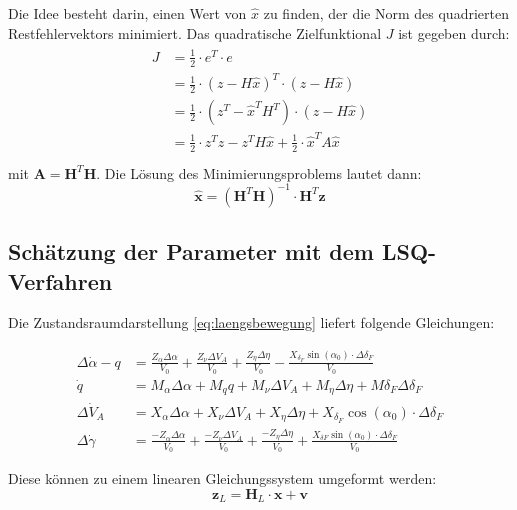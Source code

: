 Die Idee besteht darin, einen Wert von $\hat{x}$ zu finden, der die Norm des quadrierten Restfehlervektors minimiert. Das 
quadratische Zielfunktional $J$ ist gegeben durch: 
\begin{align}
   \begin{split}
     J &= \frac{1}{2} \cdot e^{T} \cdot e \\
     &= \frac{1}{2} \cdot {(z- H\hat{x})}^{T}\cdot(z- H\hat{x}) \\
     &= \frac{1}{2} \cdot (z^{T} -{\hat{x}}^{T}H^{T})\cdot(z- H\hat{x}) \\
     &= \frac{1}{2} \cdot z^{T}z - z^{T}H\hat{x} + \frac{1}{2}\cdot {\hat{x}}^{T}A\hat{x}  \\
   \end{split}
\end{align}
mit $\textbf{A} = \textbf{H}^{T} \textbf{H}$. Die Lösung des Minimierungsproblems lautet dann:
\begin{equation}
    \hat{\textbf{x}}= {(\textbf{H}^{T} \textbf{H})}^{-1} \cdot \textbf{H}^{T} \textbf{z} 
\end{equation}


\subsection{Schätzung der Parameter mit dem LSQ-Verfahren} 

Die Zustandsraumdarstellung \eqref{eq:laengsbewegung} liefert folgende Gleichungen: 

\begin{align}
	\Delta\dot \alpha-q &=  \frac{Z_{\alpha}\Delta\alpha}{V_0} + \frac{Z_{\nu}\Delta V_{A}}{V_0} + 
	\frac{Z_{\eta}\Delta\eta}{V_0} - \frac{X_{\delta_F}\sin{(\alpha_0)}\cdot\Delta\delta_F}{V_0}\\
	\dot q &= M_{\alpha}\Delta\alpha + M_q q + M_{\nu}\Delta V_A + M_{\eta}\Delta\eta + M{\delta_F}\Delta\delta_F\\
	\Delta\dot V_A &= X_{\alpha}\Delta\alpha +  X_{\nu}\Delta V_A + X_{\eta}\Delta\eta + 
	X_{\delta_F}\cos{(\alpha_0)}\cdot\Delta\delta_F \\
	\Delta \dot \gamma &= \frac{- Z_{\alpha}\Delta\alpha}{V_0} + \frac{- Z_{\nu}\Delta V_{A}}{V_0} + 
	\frac{-Z_{\eta}\Delta\eta}{V_0} + \frac{X_{\delta F}\sin{(\alpha_0)}\cdot\Delta\delta_F}{V_0}
\end{align}
	
Diese können zu einem linearen Gleichungssystem umgeformt werden: 
\begin{equation}
    \textbf{z}_{L}= \textbf{H}_{L}\cdot \textbf{x} + \textbf{v}
\end{equation}

